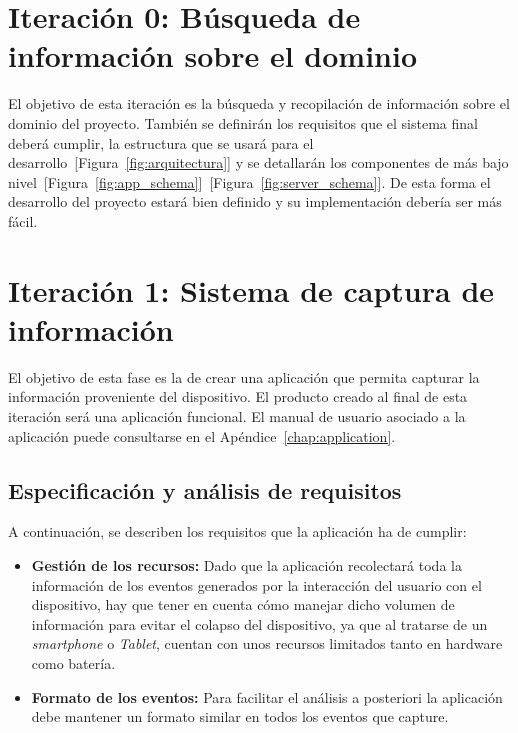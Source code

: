 \section{Iteración 0: Búsqueda de información sobre el dominio}
El objetivo de esta iteración es la búsqueda y recopilación de información sobre el dominio del proyecto. También se definirán los requisitos que el sistema final deberá cumplir, la estructura que se usará para el desarrollo~[Figura~\ref{fig:arquitectura}] y se detallarán los componentes de más bajo nivel~[Figura~\ref{fig:app_schema}]~[Figura~\ref{fig:server_schema}].
De esta forma el desarrollo del proyecto estará bien definido y su implementación debería ser más fácil.

\section{Iteración 1: Sistema de captura de información}
El objetivo de esta fase es la de crear una aplicación que permita capturar la información proveniente del dispositivo. El producto creado al final de esta iteración será una aplicación funcional. El manual de usuario asociado a la aplicación puede consultarse en el Apéndice~\ref{chap:application}.

\subsection{Especificación y análisis de requisitos}
A continuación, se describen los requisitos que la aplicación ha de cumplir:
\begin{itemize}
    \item \textbf{Gestión de los recursos:} Dado que la aplicación recolectará toda la información de los eventos generados por la interacción del usuario con el dispositivo, hay que tener en cuenta cómo manejar dicho volumen de información para evitar el colapso del dispositivo, ya que al tratarse de un \textit{smartphone} o \textit{Tablet}, cuentan con unos recursos limitados tanto en hardware como batería. 
    
     \item \textbf{Formato de los eventos:} Para facilitar el análisis a posteriori la aplicación debe mantener un formato similar en todos los eventos que capture.
     
\end{itemize}


